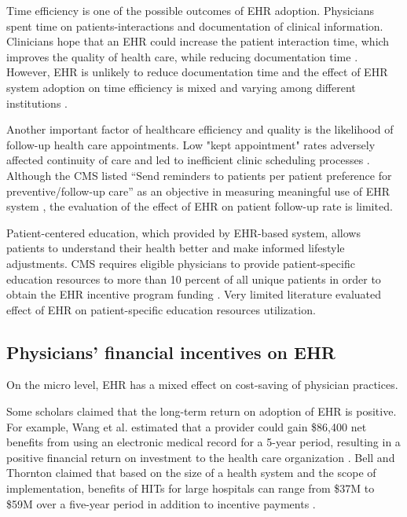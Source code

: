 \documentclass[12pt]{report}
\begin{document}
Time efficiency is one of the possible outcomes of EHR adoption. Physicians spent time on patients-interactions and documentation of clinical information. Clinicians hope that an EHR could increase the patient interaction time, which improves the quality of health care, while reducing documentation time \citep{leung2003incentives}. However, EHR is unlikely to reduce documentation time \citep{poissant2005impact} and the effect of EHR system adoption on time efficiency is mixed and varying among different institutions \citep{Chaudhry2006}.

Another important factor of healthcare efficiency and quality is the likelihood of follow-up health care appointments. Low "kept appointment" rates adversely affected continuity of care and led to inefficient clinic scheduling processes \citep{myers2001strategies}. Although the CMS listed ``Send reminders to patients per patient preference for preventive/follow-up care'' as an objective in measuring meaningful use of EHR system \citep{cmsincentive14}, the evaluation of the effect of EHR on patient follow-up rate is limited.

Patient-centered education, which provided by EHR-based system, allows patients to understand their health better and make informed lifestyle adjustments. CMS requires eligible physicians to provide patient-specific education resources to more than 10 percent of all unique patients in order to obtain the EHR incentive program funding \citep{healthit05}. Very limited literature evaluated effect of EHR on patient-specific education resources utilization. 

\subsection{Physicians' financial incentives on EHR}
On the micro level, EHR has a mixed effect on cost-saving of physician practices.

Some scholars claimed that the long-term return on adoption of EHR is positive. For example, Wang et al. estimated that a provider could gain \$86,400 net benefits from using an electronic medical record for a 5-year period, resulting in a positive financial return on investment to the health care organization \citep{Wang2003}. Bell and Thornton claimed that based on the size of a health system and the scope of implementation, benefits of HITs for large hospitals can range from \$37M to \$59M over a five-year period in addition to incentive payments \citep{Bell2011}.
\end{document}
